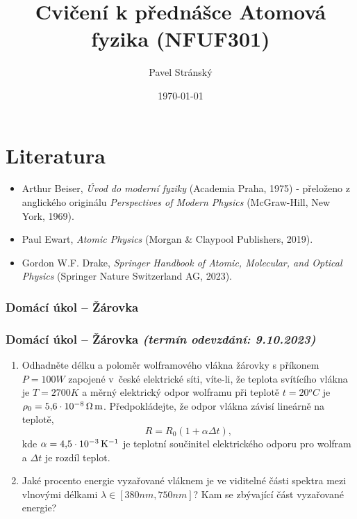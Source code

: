 \documentclass[a4paper,11pt,twoside]{article}
\newenvironment{homework}{}{}
\newcommand{\np}{\clearpage\newpage}
\newcommand{\exercise}[2][]{\ifthenelse{\isempty{#1}}
	{\np\thispagestyle{empty}\subsubsection*{Domácí úkol -- #2}}
	{\np\thispagestyle{empty}\np\subsubsection*{Domácí úkol -- #2 \small{\it{(termín odevzdání: {#1})}}}}
}
\begin{document}
\makeatletter
{}
\renewcommand{\theequation}{\arabic{section}.\arabic{subsection}.\arabic{equation}}
\makeatother

\title{Cvičení k přednášce Atomová fyzika (NFUF301)}
\date{\today}
\author{Pavel Stránský}

\maketitle
{}
\tableofcontents\np

\section*{Literatura}
\begin{itemize}
	\item Arthur Beiser, {\it Úvod do moderní fyziky} (Academia Praha, 1975) - přeloženo z anglického originálu {\it Perspectives of Modern Physics} (McGraw-Hill, New York, 1969).
	
	\item Paul Ewart, {\it Atomic Physics} (Morgan \& Claypool Publishers, 2019).
	
	\item Gordon W.F. Drake, {\it Springer Handbook of Atomic, Molecular, and Optical Physics} (Springer Nature Switzerland AG, 2023).
\end{itemize}

\np
\np
\np
\np
\np
\np
\np
\np
\np
\np

\begin{homework}
\exercise[9.10.2023]{Žárovka}
	\begin{enumerate}
		\item
			Odhadněte délku a poloměr wolframového vlákna žárovky s příkonem $P=100\unit{W}$ zapojené v~české elektrické síti, víte-li, že teplota svítícího vlákna je $T=2700\unit{K}$ a měrný elektrický odpor wolframu při teplotě $t=20\unit{^{o}C}$ je $\rho_{0}=5,\!6\cdot10^{-8}\,\Omega\,\mathrm{{m}}$.
			Předpokládejte, že odpor vlákna závisí lineárně na teplotě,
			\begin{equation*}
				R=R_{0}(1+\alpha\Delta t),
			\end{equation*}
			kde $\alpha=4,\!5\cdot10^{-3}\,\mathrm{{K^{-1}}}$ je teplotní součinitel elektrického odporu pro wolfram a $\Delta t$ je rozdíl teplot.

		\item
		    Jaké procento energie vyzařované vláknem je ve viditelné části spektra mezi vlnovými délkami $\lambda\in[380\unit{nm},750\unit{nm}]$?
			Kam se  zbývající část vyzařované energie?
	\end{enumerate}

	\newpage
\end{homework}
\end{document}
